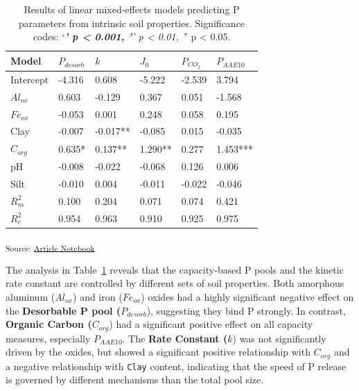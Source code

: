 \documentclass[
  a4paper,
]{article}
\begin{document}
\begin{longtable}[]{@{}llllll@{}}

\caption{\label{tbl-soil-prop-models}Results of linear mixed-effects
models predicting P parameters from intrinsic soil properties.
Significance codes: `\emph{\textbf{' p \textless{} 0.001, '}' p
\textless{} 0.01, '}' p \textless{} 0.05.}

\tabularnewline

\toprule\noalign{}
Model & \(P_{desorb}\) & \(k\) & \(J_0\) & \(P_{CO_2}\) &
\(P_{AAE10}\) \\
\midrule\noalign{}
\endhead
\bottomrule\noalign{}
\endlastfoot
Intercept & -4.316 & 0.608 & -5.222 & -2.539 & 3.794 \\
\(Al_{ox}\) & 0.603 & -0.129 & 0.367 & 0.051 & -1.568 \\
\(Fe_{ox}\) & -0.053 & 0.001 & 0.248 & 0.058 & 0.195 \\
Clay & -0.007 & -0.017** & -0.085 & 0.015 & -0.035 \\
\(C_{org}\) & 0.635* & 0.137** & 1.290** & 0.277 & 1.453*** \\
pH & -0.008 & -0.022 & -0.068 & 0.126 & 0.006 \\
Silt & -0.010 & 0.004 & -0.011 & -0.022 & -0.046 \\
\(R^2_m\) & 0.100 & 0.204 & 0.071 & 0.074 & 0.421 \\
\(R^2_c\) & 0.954 & 0.963 & 0.910 & 0.925 & 0.975 \\

\end{longtable}

\textsubscript{Source:
\href{https://Andrapodon.github.io/Master-Thesis-P-kinetics/index.qmd.html}{Article
Notebook}}

The analysis in Table~\ref{tbl-soil-prop-models} reveals that the
capacity-based P pools and the kinetic rate constant are controlled by
different sets of soil properties. Both amorphous aluminum (\(Al_{ox}\))
and iron (\(Fe_{ox}\)) oxides had a highly significant negative effect
on the \textbf{Desorbable P pool (}\(P_{desorb}\)), suggesting they bind
P strongly. In contrast, \textbf{Organic Carbon (}\(C_{org}\)) had a
significant positive effect on all capacity measures, especially
\(P_{AAE10}\). The \textbf{Rate Constant (}\(k\)) was not significantly
driven by the oxides, but showed a significant positive relationship
with \(C_{org}\) and a negative relationship with \texttt{Clay} content,
indicating that the speed of P release is governed by different
mechanisms than the total pool size.
\end{document}
